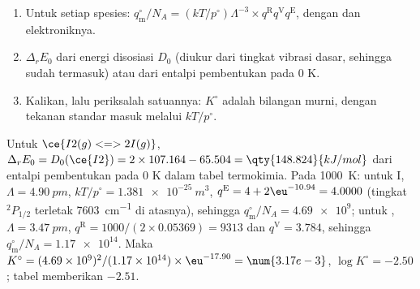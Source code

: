 \begin{method}\label{met:b3:statistical-thermo-applied:k-stat}
\begin{enumerate}
  \item Untuk setiap spesies: $q^\circ_{\mathrm m}/N_A = (kT/p^\circ)\Lambda^{-3}\times q^{\mathrm R}q^{\mathrm V}q^{\mathrm E}$,
        dengan  dan  elektroniknya.
  \item $\Delta_rE_0$ dari energi disosiasi $D_0$ (diukur dari tingkat vibrasi
        dasar, sehingga  sudah termasuk) atau dari entalpi
        pembentukan pada 0 K.
  \item Kalikan, lalu periksalah satuannya: $K^\circ$ adalah bilangan murni,
        dengan tekanan standar masuk melalui $kT/p^\circ$.
\end{enumerate}
\end{method}

\begin{example}\label{ex:b3:statistical-thermo-applied:iodine}
Untuk $\ce{I2(g) <=> 2 I(g)}$, $\Delta_rE_0 = D_0(\ce{I2}) = 2 \times 107.164 - 65.504 = \qty{148.824}{kJ/mol}$
dari entalpi pembentukan pada 0 K dalam tabel termokimia. Pada \qty{1000}{K}:
untuk I, $\Lambda = \qty{4.90}{pm}$, $kT/p^\circ = \qty{1.381e-25}{m^3}$, $q^{\mathrm E} = 4 +
2\eu^{-10.94} = 4.0000$ (tingkat ${}^2P_{1/2}$ terletak \qty{7603}{cm^{-1}} di atasnya),
sehingga $q^\circ_{\mathrm m}/N_A = \num{4.69e9}$; untuk , $\Lambda = \qty{3.47}{pm}$,
$q^{\mathrm R} = 1000/(2 \times 0.05369) = 9313$ dan $q^{\mathrm V} = 3.784$, sehingga
$q^\circ_{\mathrm m}/N_A = \num{1.17e14}$. Maka $K^\circ = (4.69\times10^9)^2/(1.17\times10^{14}) \times \eu^{-17.90} =
\num{3.17e-3}$, $\log K^\circ = -2.50$; tabel memberikan $-2.51$.
\end{example}

